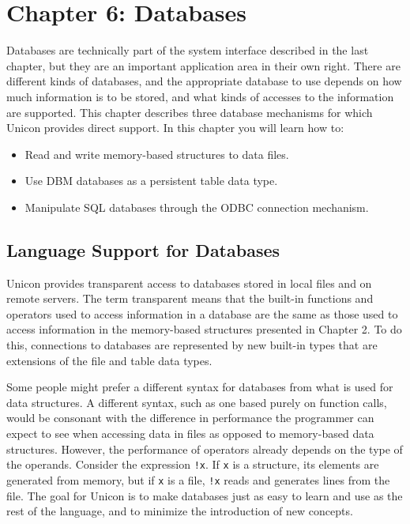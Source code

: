 \clearpage\section{Chapter 6: Databases}

Databases are technically part of the system interface
described in the last chapter, but they are an important application
area in their own right. There are different kinds of databases, and
the appropriate database to use depends on how much information is to
be stored, and what kinds of accesses to the information are supported.
This chapter describes three database mechanisms for which Unicon
provides direct support. In this chapter you will learn how to:

\begin{itemize}
\item Read and write memory-based structures to data files.
\item Use DBM databases as a persistent table data type.
\item Manipulate SQL databases through the ODBC connection mechanism.
\end{itemize}

\subsection{Language Support for Databases}

Unicon provides transparent access to databases stored in local files
and on remote servers. The term
{\textquotedbl}transparent{\textquotedbl} means that the built-in
functions and operators used to access information in a database are
the same as those used to access information in the memory-based
structures presented in Chapter 2. To do this, connections to databases
are represented by new built-in types that are extensions of the file
and table data types.

Some people might prefer a different syntax for databases from what is
used for data structures. A different syntax, such as one based purely
on function calls, would be consonant with the difference in
performance the programmer can expect to see when accessing data in
files as opposed to memory-based data structures. However, the
performance of operators already depends on the type of the operands.
Consider the expression \texttt{!x}. If \texttt{x} is a structure, its
elements are generated from memory, but if \texttt{x} is a file,
\texttt{!x} reads and generates lines from the file. The goal for
Unicon is to make databases just as easy to learn and use as the rest
of the language, and to minimize the introduction of new concepts.

